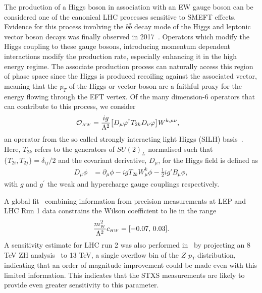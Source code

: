 The production of a Higgs boson in association with an EW gauge boson can be considered one of the canonical LHC processes sensitive to SMEFT effects. Evidence for this process involving the $b\bar{b}$ decay mode of the Higgs and leptonic vector boson decays was finally observed in 2017~\cite{Aaboud:2017xsd,Sirunyan:2017elk}. Operators which modify the Higgs coupling to these gauge bosons, introducing momentum dependent interactions modify the production rate, especially enhancing it in the high energy regime. The associate production process can naturally access this region of phase space since the Higgs is produced recoiling against the associated vector, meaning that the $p_T$ of the Higgs or vector boson are a faithful proxy for the energy flowing through the EFT vertex. Of the many dimension-6 operators that can contribute to this process, we consider 
\begin{align}
    \mathcal{O}_{\scriptscriptstyle HW} &= 
    \frac{ig}{\Lambda^2} \big[D_\mu \varphi^\dag T_{2k} D_\nu \varphi\big] 
    W^{k,\mu \nu},
\end{align}
an operator from the so called strongly interacting light Higgs (SILH) basis~\cite{Giudice:2007fh,Contino:2013kra}. Here, $T_{2k}$ refers to the generators of $SU(2)_L$ normalised such that $\{T_{2i},T_{2j}\}=\delta_{ij}/2$ and the covariant derivative, $D_\mu$, for the Higgs field is defined as
\begin{align}
    D_\mu\phi &= \partial_\mu \phi -  i g T_{2k} W_\mu^k \phi - \frac12 i g' B_\mu \phi,
\end{align}
with $g$ and $g^\prime$ the weak and hypercharge gauge couplings respectively.

A global fit~\cite{Ellis:2014jta} combining information from precision measurements at LEP and LHC Run 1 data constrains the Wilson coefficient to lie in the range 
\begin{align}
    \frac{m_{\scriptscriptstyle W}^2}{\Lambda^2}c_{\scriptscriptstyle HW} = [-0.07,\,0.03].
\end{align}
A sensitivity estimate for LHC run 2 was also performed in~\cite{Degrande:2016dqg} by projecting an 8 TeV ZH analysis~\cite{TheATLAScollaboration:2013lia} to 13 TeV, a single overflow bin of the $Z$ $p_T$ distribution, indicating that an order of magnitude improvement could be made even with this limited information. This indicates that the STXS measurements are likely to provide even greater sensitivity to this parameter.

